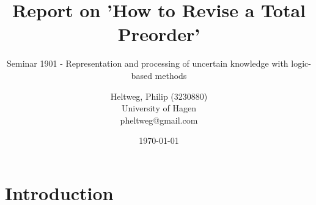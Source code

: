 \documentclass[11pt]{scrartcl}
\begin{document}
\title{Report on 'How to Revise a Total Preorder' \cite{Booth2011}}
\subtitle{Seminar 1901 - Representation and processing of uncertain knowledge with logic-based methods}
\author{
	Heltweg, Philip (3230880) \\
	University of Hagen \\
	pheltweg@gmail.com
}
\date{\today}
\maketitle


\newpage

\tableofcontents

\newpage

\section{Introduction}
\end{document}
